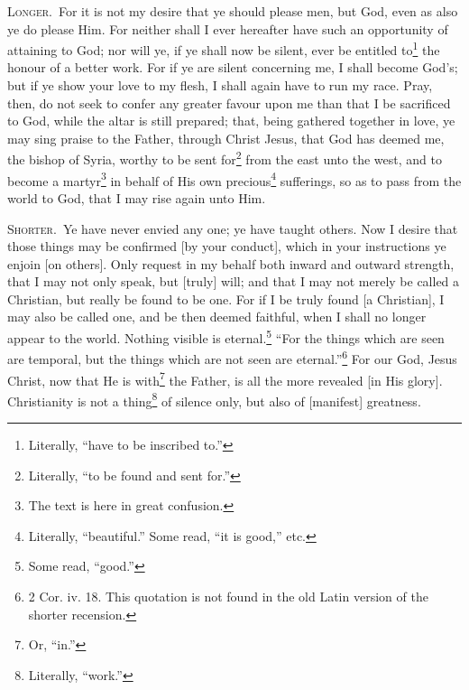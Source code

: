 \textsc{Longer.}~For it is not my desire that ye should please men, but God, even as also ye do please Him. For neither shall I ever hereafter have such an opportunity of attaining to God; nor will ye, if ye shall now be silent, ever be entitled to\footnote{Literally, “have to be inscribed to.”} the honour of a better work. For if ye are silent concerning me, I shall become God’s; but if ye show your love to my flesh, I shall again have to run my race. Pray, then, do not seek to confer any greater favour upon me than that I be sacrificed to God, while the altar is still prepared; that, being gathered together in love, ye may sing praise to the Father, through Christ Jesus, that God has deemed me, the bishop of Syria, worthy to be sent for\footnote{Literally, “to be found and sent for.”} from the east unto the west, and to become a martyr\footnote{The text is here in great confusion.} in behalf of His own precious\footnote{Literally, “beautiful.” Some read, “it is good,” etc.} sufferings, so as to pass from the world to God, that I may rise again unto Him.


\textsc{Shorter.}~Ye have never envied any one; ye have taught others. Now I desire that those things may be confirmed [by your conduct], which in your instructions ye enjoin [on others]. Only request in my behalf both inward and outward strength, that I may not only speak, but [truly] will; and that I may not merely be called a Christian, but really be found to be one. For if I be truly found [a Christian], I may also be called one, and be then deemed faithful, when I shall no longer appear to the world. Nothing visible is eternal.\footnote{Some read, “good.”} “For the things which are seen are temporal, but the things which are not seen are eternal.”\footnote{2 Cor. iv. 18. This quotation is not found in the old Latin version of the shorter recension.} For our God, Jesus Christ, now that He is with\footnote{Or, “in.”} the Father, is all the more revealed [in  His glory]. Christianity is not a thing\footnote{Literally, “work.”} of silence only, but also of [manifest] greatness.

